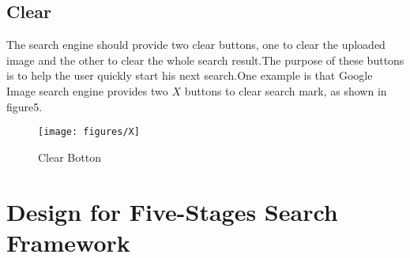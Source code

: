 \documentclass{hci}
\begin{document}
\subsection{Clear}
The search engine should provide two clear buttons, one to clear the uploaded image and the other to clear the whole search result.The purpose of these buttons is to help the user quickly start his next search.One example is that Google Image search engine provides two $X$ buttons to clear search mark, as shown in figure5.
\begin{figure}[htbp]
	\centering
	\texttt{[image: figures/X]}
	\caption{Clear Botton}
	\label{fig:X}
\end{figure}


\section{Design for Five-Stages Search Framework}
\end{document}
